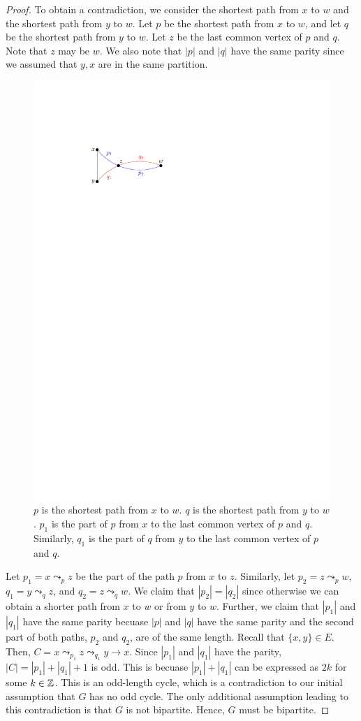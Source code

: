 \begin{proof}
    To obtain a contradiction, we consider the shortest path from $x$ to $w$ and the shortest path from $y$ to $w$. Let $p$ be the shortest path from $x$ to $w$, and let $q$ be the shortest path from $y$ to $w$. Let $z$ be the last common vertex of $p$ and $q$. Note that $z$ may be $w$. We also note that $|p|$ and $|q|$ have the same parity since we assumed that $y,x$ are in the same partition.

    \begin{figure}[htbp]
        \centering
        \includegraphics[width=0.3\linewidth]{figures/odd-length-cycle-bipartite.pdf}
        \caption{$p$ is the shortest path from $x$ to $w$. $q$ is the shortest path from $y$ to $w$. $p_1$ is the part of $p$ from $x$ to the last common vertex of $p$ and $q$. Similarly, $q_1$ is the part of $q$ from $y$ to the last common vertex of $p$ and $q$.}
        \label{fig:odd-length-cycle-bipartite}
    \end{figure}
    
    Let $p_1 = x \leadsto_p z$ be the part of the path $p$ from $x$ to $z$. Similarly, let $p_2 = z \leadsto_p w$, $q_1 = y \leadsto_q z$, and $q_2 = z \leadsto_q w$. We claim that $|p_2| = |q_2|$ since otherwise we can obtain a shorter path from $x$ to $w$ or from $y$ to $w$. Further, we claim that $|p_1|$ and $|q_1|$ have the same parity becuase $|p|$ and $|q|$ have the same parity and the second part of both paths, $p_2$ and $q_2$, are of the same length. Recall that $\{x,y\} \in E$. Then, $C = x \leadsto_{p_1} z \leadsto_{q_1} y \to x$. Since $|p_1|$ and $|q_1|$ have the parity, $|C| = |p_1| + |q_1| + 1$ is odd. This is becuase $|p_1| + |q_1|$ can be expressed as $2k$ for some $k \in \mathbb{Z}$. This is an odd-length cycle, which is a contradiction to our initial assumption that $G$ has no odd cycle. The only additional assumption leading to this contradiction is that $G$ is not bipartite. Hence, $G$ must be bipartite.
\end{proof}

